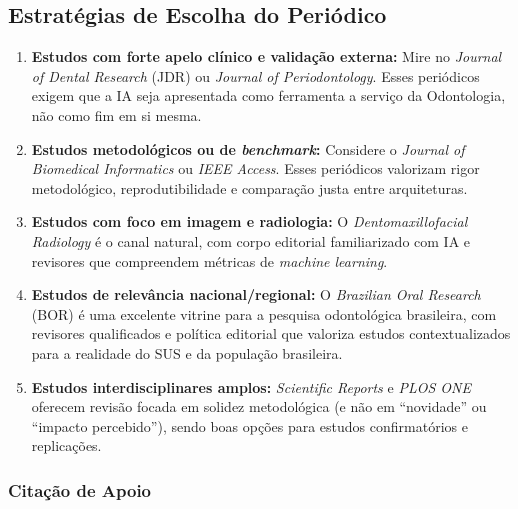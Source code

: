 
\subsection{Estratégias de Escolha do Periódico}

\begin{enumerate}
  \item \textbf{Estudos com forte apelo clínico e validação externa:} Mire no
    \textit{Journal of Dental Research} (JDR) ou \textit{Journal of
    Periodontology}. Esses periódicos exigem que a IA seja apresentada como
    ferramenta a serviço da Odontologia, não como fim em si mesma.

  \item \textbf{Estudos metodológicos ou de \textit{benchmark}:} Considere o
    \textit{Journal of Biomedical Informatics} ou \textit{IEEE Access}. Esses
    periódicos valorizam rigor metodológico, reprodutibilidade e comparação
    justa entre arquiteturas.

  \item \textbf{Estudos com foco em imagem e radiologia:} O
    \textit{Dentomaxillofacial Radiology} é o canal natural, com corpo editorial
    familiarizado com IA e revisores que compreendem métricas de \textit{machine
    learning}.

  \item \textbf{Estudos de relevância nacional/regional:} O \textit{Brazilian
    Oral Research} (BOR) é uma excelente vitrine para a pesquisa odontológica
    brasileira, com revisores qualificados e política editorial que valoriza
    estudos contextualizados para a realidade do SUS e da população brasileira.

  \item \textbf{Estudos interdisciplinares amplos:} \textit{Scientific Reports}
    e \textit{PLOS ONE} oferecem revisão focada em solidez metodológica (e não em
    ``novidade'' ou ``impacto percebido''), sendo boas opções para estudos
    confirmatórios e replicações.
\end{enumerate}

\subsubsection{Citação de Apoio}

